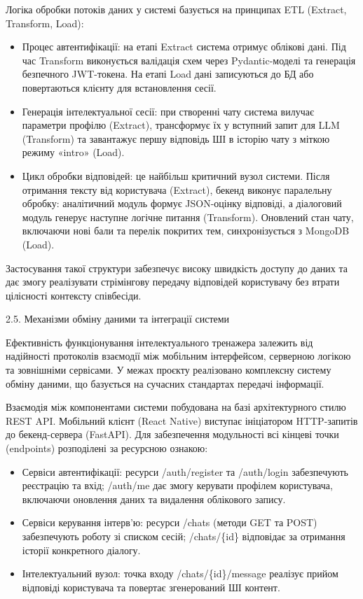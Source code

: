 Логіка обробки потоків даних у системі базується на принципах ETL
(Extract, Transform, Load):

\begin{itemize}
\item
  Процес автентифікації: на етапі Extract система отримує облікові дані.
  Під час Transform виконується валідація схем через Pydantic-моделі та
  генерація безпечного JWT-токена. На етапі Load дані записуються до БД
  або повертаються клієнту для встановлення сесії.
\item
  Генерація інтелектуальної сесії: при створенні чату система вилучає
  параметри профілю (Extract), трансформує їх у вступний запит для LLM
  (Transform) та завантажує першу відповідь ШІ в історію чату з міткою
  режиму «intro» (Load).
\item
  Цикл обробки відповідей: це найбільш критичний вузол системи. Після
  отримання тексту від користувача (Extract), бекенд виконує паралельну
  обробку: аналітичний модуль формує JSON-оцінку відповіді, а діалоговий
  модуль генерує наступне логічне питання (Transform). Оновлений стан
  чату, включаючи нові бали та перелік покритих тем, синхронізується з
  MongoDB (Load).
\end{itemize}

Застосування такої структури забезпечує високу швидкість доступу до
даних та дає змогу реалізувати стрімінгову передачу відповідей
користувачу без втрати цілісності контексту співбесіди.

\protect{}\label{_Toc228981063}{}2.5. Механізми обміну
даними та інтеграції системи

Ефективність функціонування інтелектуального тренажера залежить від
надійності протоколів взаємодії між мобільним інтерфейсом, серверною
логікою та зовнішніми сервісами. У межах проєкту реалізовано комплексну
систему обміну даними, що базується на сучасних стандартах передачі
інформації.

Взаємодія між компонентами системи побудована на базі архітектурного
стилю REST API. Мобільний клієнт (React Native) виступає ініціатором
HTTP-запитів до бекенд-сервера (FastAPI). Для забезпечення модульності
всі кінцеві точки (endpoints) розподілені за ресурсною ознакою:

\begin{itemize}
\item
  Сервіси автентифікації: ресурси /auth/register та /auth/login
  забезпечують реєстрацію та вхід; /auth/me дає змогу керувати профілем
  користувача, включаючи оновлення даних та видалення облікового запису.
\item
  Сервіси керування інтерв'ю: ресурси /chats (методи GET та POST)
  забезпечують роботу зі списком сесій; /chats/\{id\} відповідає за
  отримання історії конкретного діалогу.
\item
  Інтелектуальний вузол: точка входу /chats/\{id\}/message реалізує
  прийом відповіді користувача та повертає згенерований ШІ контент.
\end{itemize}


